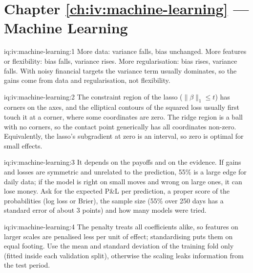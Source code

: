 \section*{Chapter \ref{ch:iv:machine-learning} --- Machine Learning}

\begin{solution}{iq:iv:machine-learning:1}
More data: variance falls, bias unchanged. More features or flexibility: bias falls, variance rises. More regularisation:
bias rises, variance falls. With noisy financial targets the variance term usually dominates, so the gains come from data
and regularisation, not flexibility.
\end{solution}

\begin{solution}{iq:iv:machine-learning:2}
The constraint region of the lasso ($\|\beta\|_1 \le t$) has corners on the axes, and the elliptical contours of the squared
loss usually first touch it at a corner, where some coordinates are zero. The ridge region is a ball with no corners, so the
contact point generically has all coordinates non-zero. Equivalently, the lasso's subgradient at zero is an interval, so zero
is optimal for small effects.
\end{solution}

\begin{solution}{iq:iv:machine-learning:3}
It depends on the payoffs and on the evidence. If gains and losses are symmetric and unrelated to the prediction, 55\% is a
large edge for daily data; if the model is right on small moves and wrong on large ones, it can lose money. Ask for the
expected P\&L per prediction, a proper score of the probabilities (log loss or Brier), the sample size (55\% over 250 days has a
standard error of about 3 points) and how many models were tried.
\end{solution}

\begin{solution}{iq:iv:machine-learning:4}
The penalty treats all coefficients alike, so features on larger scales are penalised less per unit of effect; standardising
puts them on equal footing. Use the mean and standard deviation of the training fold only (fitted inside each validation
split), otherwise the scaling leaks information from the test period.
\end{solution}

